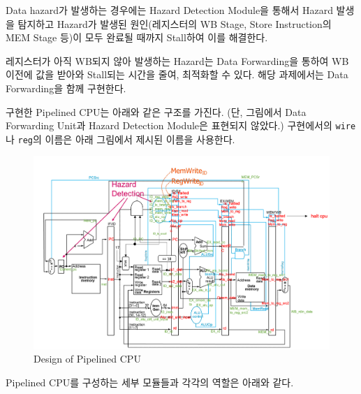 \documentclass[openright, a4paper]{article}
\newcommand{\code}[1]{\texttt{#1}}
\begin{document}
\hfill

Data hazard가 발생하는 경우에는 Hazard Detection Module을 통해서 Hazard 발생을 탐지하고 Hazard가 발생된 원인(레지스터의 WB Stage, Store Instruction의 MEM Stage 등)이 모두 완료될 때까지 Stall하여 이를 해결한다.

\hfill

레지스터가 아직 WB되지 않아 발생하는 Hazard는 Data Forwarding을 통하여 WB 이전에 값을 받아와 Stall되는 시간을 줄여, 최적화할 수 있다. 해당 과제에서는 Data Forwarding을 함께 구현한다.

\hfill

구현한 Pipelined CPU는 아래와 같은 구조를 가진다. (단, 그림에서 Data Forwarding Unit과 Hazard Detection Module은 표현되지 않았다.) 구현에서의 \code{wire}나 \code{reg}의 이름은 아래 그림에서 제시된 이름을 사용한다.

\hfill

{
    \begin{figure}[!h]
        \centering
        \includegraphics[width=\textwidth]{img/schematic.png}
        \caption{Design of Pipelined CPU}
    \end{figure}
}

\hfill

Pipelined CPU를 구성하는 세부 모듈들과 각각의 역할은 아래와 같다.

\hfill
\end{document}
